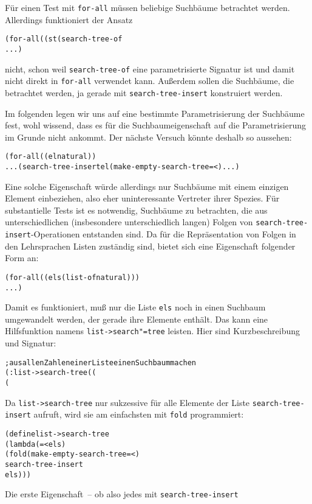 Für einen Test mit \texttt{for-all} müssen beliebige Suchbäume
betrachtet werden.  Allerdings funktioniert der Ansatz
%
\begin{alltt}
(for-all ((st (search-tree-of %a)))
  ...)
\end{alltt}
%
nicht, schon weil \texttt{search-tree-of} eine  parametrisierte Signatur ist und
damit nicht direkt in \texttt{for-all} verwendet kann.  Außerdem
sollen die Suchbäume, die betrachtet werden, ja gerade mit
\texttt{search-tree-insert} konstruiert werden.  

Im folgenden legen wir uns auf eine bestimmte Parametrisierung der Suchbäume
fest, wohl wissend, dass es für die Suchbaumeigenschaft auf die
Parametrisierung im Grunde nicht ankommt. Der nächste Versuch
könnte deshalb so aussehen:
%
\begin{alltt}
(for-all ((el natural))
  ... (search-tree-insert el (make-empty-search-tree = <) ...)
\end{alltt}
%
Eine solche Eigenschaft würde allerdings nur Suchbäume mit einem
einzigen Element einbeziehen, also eher uninteressante Vertreter ihrer
Spezies.  Für substantielle Tests ist es notwendig, Suchbäume zu
betrachten, die aus unterschiedlichen (insbesondere unterschiedlich
langen) Folgen von \texttt{search-tree-insert}-Operationen entstanden
sind.  Da für die Repräsentation von Folgen in den Lehrsprachen Listen zuständig
sind, bietet sich eine Eigenschaft folgender Form an:
%
\begin{alltt}
(for-all ((els (list-of natural)))
  ...)
\end{alltt}
%
Damit es funktioniert, muß nur die Liste \texttt{els} noch in einen
Suchbaum umgewandelt werden, der gerade ihre Elemente enthält.  Das
kann eine Hilfsfunktion namens \texttt{list->search"=tree} leisten.
Hier sind Kurzbeschreibung und Signatur:
%
\begin{alltt}
; aus allen Zahlen einer Liste einen Suchbaum machen
(: list->search-tree ((%a %a -> boolean)
                      (%a %a -> boolean) (list-of %a) -> (search-tree-of %a)))
\end{alltt}
%
Da \texttt{list->search-tree} nur sukzessive für alle Elemente der
Liste \texttt{search-tree-insert} aufruft, wird sie am einfachsten mit
\texttt{fold} programmiert:
%
\begin{alltt}
(define list->search-tree
  (lambda (= < els)
    (fold (make-empty-search-tree = <)
          search-tree-insert
          els)))
\end{alltt}
%
Die erste Eigenschaft~-- ob also jedes mit \texttt{search-tree-insert}
